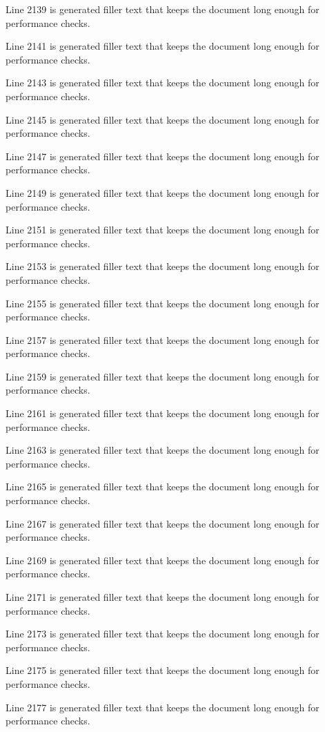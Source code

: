 Line 2139 is generated filler text that keeps the document long enough for performance checks.

Line 2141 is generated filler text that keeps the document long enough for performance checks.

Line 2143 is generated filler text that keeps the document long enough for performance checks.

Line 2145 is generated filler text that keeps the document long enough for performance checks.

Line 2147 is generated filler text that keeps the document long enough for performance checks.

Line 2149 is generated filler text that keeps the document long enough for performance checks.

Line 2151 is generated filler text that keeps the document long enough for performance checks.

Line 2153 is generated filler text that keeps the document long enough for performance checks.

Line 2155 is generated filler text that keeps the document long enough for performance checks.

Line 2157 is generated filler text that keeps the document long enough for performance checks.

Line 2159 is generated filler text that keeps the document long enough for performance checks.

Line 2161 is generated filler text that keeps the document long enough for performance checks.

Line 2163 is generated filler text that keeps the document long enough for performance checks.

Line 2165 is generated filler text that keeps the document long enough for performance checks.

Line 2167 is generated filler text that keeps the document long enough for performance checks.

Line 2169 is generated filler text that keeps the document long enough for performance checks.

Line 2171 is generated filler text that keeps the document long enough for performance checks.

Line 2173 is generated filler text that keeps the document long enough for performance checks.

Line 2175 is generated filler text that keeps the document long enough for performance checks.

Line 2177 is generated filler text that keeps the document long enough for performance checks.

